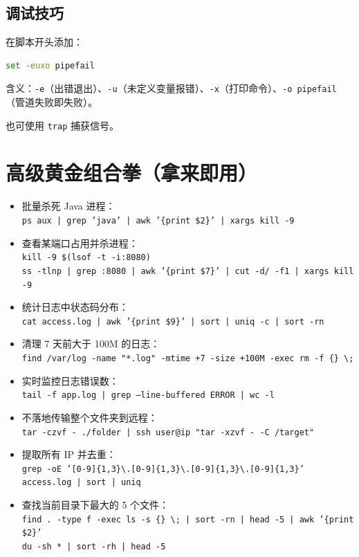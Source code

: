 \subsection{调试技巧} 在脚本开头添加：
\begin{lstlisting}[language=bash]
	set -euxo pipefail
\end{lstlisting}
含义：\texttt{-e}（出错退出）、\texttt{-u}（未定义变量报错）、\texttt{-x}（打印命令）、\texttt{-o pipefail}（管道失败即失败）。

也可使用 \texttt{trap} 捕获信号。

\section{高级黄金组合拳（拿来即用）}
\begin{itemize}
\item 批量杀死 Java 进程：\\ \texttt{ps aux | grep 'java' | awk '\{print \$2\}' | xargs kill -9}
\item 查看某端口占用并杀进程：\\ \texttt{kill -9 \$(lsof -t -i:8080)} \\ \texttt{ss -tlnp | grep :8080 | awk '\{print \$7\}' | cut -d/ -f1 | xargs kill -9}
\item 统计日志中状态码分布：\\ \texttt{cat access.log | awk '\{print \$9\}' | sort | uniq -c | sort -rn}
\item 清理 7 天前大于 100M 的日志：\\ \texttt{find /var/log -name "*.log" -mtime +7 -size +100M -exec rm -f \{\} \textbackslash;}
\item 实时监控日志错误数：\\ \texttt{tail -f app.log | grep --line-buffered ERROR | wc -l}
\item 不落地传输整个文件夹到远程：\\ \texttt{tar -czvf - ./folder | ssh user@ip "tar -xzvf - -C /target"}
\item 提取所有 IP 并去重：\\ \texttt{grep -oE '[0-9]\{1,3\}\textbackslash.[0-9]\{1,3\}\textbackslash.[0-9]\{1,3\}\textbackslash.[0-9]\{1,3\}' access.log | sort | uniq}
\item 查找当前目录下最大的 5 个文件：\\ \texttt{find . -type f -exec ls -s \{\} \textbackslash; | sort -rn | head -5 | awk '\{print \$2\}'} \\ \texttt{du -sh * | sort -rh | head -5}
\end{itemize}

